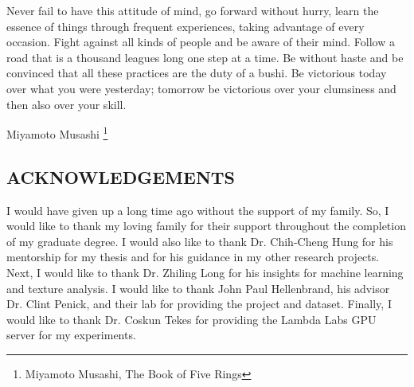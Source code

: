 \documentclass[12pt]{article}
\begin{document}
\vspace*{2in}
Never fail to have this attitude of mind, go forward without hurry, learn the
essence of things through frequent experiences, taking advantage of every
occasion. Fight against all kinds of people and be aware of their mind. Follow a
road that is a thousand leagues long one step at a time. Be without haste and be
convinced that all these practices are the duty of a bushi. Be victorious today
over what you were yesterday; tomorrow be victorious over your clumsiness and
then also over your skill.

\vspace{0.5in}
\hspace*{\fill} Miyamoto Musashi \footnote{Miyamoto Musashi, The Book of Five
    Rings}
\newpage

\begin{center}
    \section*{ACKNOWLEDGEMENTS}
\end{center}
\vspace{0.5in}

I would have given up a long time ago without the support of my family. So, I
would like to thank my loving family for their support throughout the completion
of my graduate degree. I would also like to thank Dr. Chih-Cheng Hung for his
mentorship for my thesis and for his guidance in my other research projects.
Next, I would like to thank Dr. Zhiling Long for his insights for machine
learning and texture analysis. I would like to thank John Paul Hellenbrand, his
advisor Dr. Clint Penick, and their lab for providing the project and dataset.
Finally, I would like to thank Dr. Coskun Tekes for providing the Lambda Labs
GPU server for my experiments.
\newpage

\begin{center}
    \tableofcontents
\end{center}
\newpage

\begin{center}
    \listoffigures
\end{center}
\newpage
\end{document}
